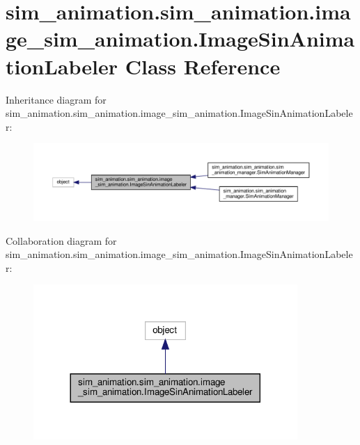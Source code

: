 \hypertarget{classsim__animation_1_1sim__animation_1_1image__sim__animation_1_1ImageSinAnimationLabeler}{}\section{sim\+\_\+animation.\+sim\+\_\+animation.\+image\+\_\+sim\+\_\+animation.\+Image\+Sin\+Animation\+Labeler Class Reference}
\label{classsim__animation_1_1sim__animation_1_1image__sim__animation_1_1ImageSinAnimationLabeler}


Inheritance diagram for sim\+\_\+animation.\+sim\+\_\+animation.\+image\+\_\+sim\+\_\+animation.\+Image\+Sin\+Animation\+Labeler\+:
\nopagebreak
\begin{figure}[H]
\begin{center}
\leavevmode
\includegraphics[width=350pt]{classsim__animation_1_1sim__animation_1_1image__sim__animation_1_1ImageSinAnimationLabeler__inherit__graph}
\end{center}
\end{figure}


Collaboration diagram for sim\+\_\+animation.\+sim\+\_\+animation.\+image\+\_\+sim\+\_\+animation.\+Image\+Sin\+Animation\+Labeler\+:
\nopagebreak
\begin{figure}[H]
\begin{center}
\leavevmode
\includegraphics[width=284pt]{classsim__animation_1_1sim__animation_1_1image__sim__animation_1_1ImageSinAnimationLabeler__coll__graph}
\end{center}
\end{figure}
